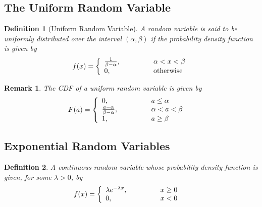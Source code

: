 \documentclass[11pt, oneside]{book}   	%
\newtheorem{definition}{Definition}[chapter]
\newtheorem{remark}{Remark}[chapter]
\begin{document}
\begin{spacing}{1.618}
\subsection{The Uniform Random Variable}

\begin{definition}[Uniform Random Variable]
	A random variable is said to be uniformly distributed over the interval $(\alpha, \beta)$ if the probability density function is given by 
	\begin{alignat}{4}
		f(x)=\left\{\begin{array}{lll}
			\frac{1}{\beta - \alpha},&\hspace{1 cm}&\alpha < x < \beta \\
			0,&\hspace{1 cm}&\textrm{otherwise}
		\end{array}\right.
	\end{alignat}
\end{definition}

\begin{remark}
	The CDF of a uniform random variable is given by 
	\begin{alignat}{4}
		F(a)&=\left\{\begin{array}{lll}
			0,&\hspace{1 cm}&a\leq \alpha \\
			\frac{a - \alpha}{\beta - \alpha},&\hspace{1 cm}& \alpha<a<\beta \\
			1,&\hspace{1 cm}& a \geq \beta 
		\end{array}\right.
	\end{alignat}
\end{remark}

\subsection{Exponential Random Variables}

\begin{definition}
	A continuous random variable whose probability density function is given, for some $\lambda > 0$, by 
	\begin{alignat}{4}
		f(x)&=\left\{\begin{array}{lll}
			\lambda e^{-\lambda x},&\hspace{1 cm}&x\geq 0 \\
			0,&\hspace{1 cm}&x< 0
		\end{array}\right.
	\end{alignat}
\end{definition}


\end{spacing}
\end{document}
